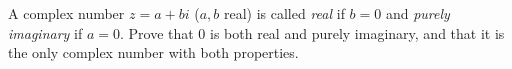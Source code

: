 A complex number $z=a+bi$ ($a,b$ real) is called \emph{real} if $b=0$ and \emph{purely imaginary} if $a=0$. Prove that $0$ is both real and purely imaginary, and that it is the only complex number with both properties.
